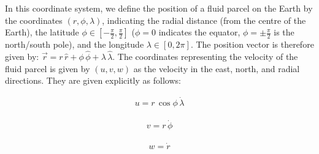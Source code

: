 In this coordinate system, we define the position of a fluid parcel on the Earth by the coordinates \((r,\phi,\lambda)\), indicating the radial distance (from the centre of the Earth), the latitude \(\phi\in[-\frac{\pi}{2},\frac{\pi}{2}]\) (\(\phi=0\) indicates the equator, \(\phi=\pm\frac{\pi}{2}\) is the north/south pole), and the longitude \(\lambda\in[0,2\pi]\). The position vector is therefore given by: \(\vec{r}=r\,\hat{r}+\phi\,\hat{\phi}+\lambda\,\hat{\lambda}\). The coordinates representing the velocity of the fluid parcel is given by \((u,v,w)\) as the velocity in the east, north, and radial directions. They are given explicitly as follows:

\vspace{-4mm}
\begin{minipage}{.31\linewidth}
\begin{align*}
    u = r\,\cos\phi\,\dot{\lambda}
\end{align*}
\end{minipage}
\begin{minipage}{.31\linewidth}
\begin{align*}
    v = r\,\dot{\phi}
\end{align*}
\end{minipage}
\begin{minipage}{.31\linewidth}
\begin{align*}
    w = \dot{r}
\end{align*}
\end{minipage}
\vspace{1mm}

